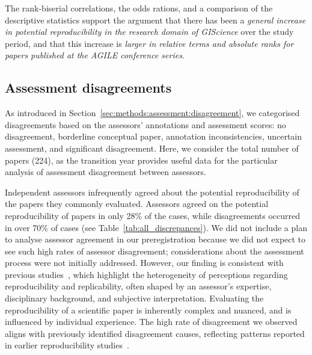 \documentclass{josis}
\begin{document}
The rank-biserial correlations, the odds rations, and a comparison of the descriptive statistics support the argument that there has been a \emph{general increase in potential reproducibility in the research domain of GIScience} over the study period, and that this increase is \emph{larger in relative terms and absolute ranks for papers published at the AGILE conference series}.

\subsection{Assessment disagreements}
\label{sec:results:assessmentprocess}

As introduced in Section~\ref{sec:methods:assessment:disagreement}, we categorised disagreements based on the assessors’ annotations and assessment scores: no disagreement, borderline conceptual paper, annotation inconsistencies, uncertain assessment, and significant disagreement. Here, we consider the total number of papers (224), as the transition year provides useful data for the particular analysis of assessment disagreement between assessors.

Independent assessors infrequently agreed about the potential reproducibility of the papers they commonly evaluated.
Assessors agreed on the potential reproducibility of papers in only 28\% of the cases, while disagreements occurred in over 70\% of cases (see Table~\ref{tab:all_discrepances}). 
We did not include a plan to analyse assessor agreement in our preregistration because we did not expect to see such high rates of assessor disagreement; considerations about the assessment process were not initially addressed. 
However, our finding is consistent with previous studies~\cite{kedron2025, konkol_computational_2019}, which highlight the heterogeneity of perceptions regarding reproducibility and replicability, often shaped by an assessor’s expertise, disciplinary background, and subjective interpretation. 
Evaluating the reproducibility of a scientific paper is inherently complex and nuanced, and is influenced by individual experience. 
The high rate of disagreement we observed aligns with previously identified disagreement causes, reflecting patterns reported in earlier reproducibility studies~\cite{nust2018, ostermann2021}.
   
\end{document}

